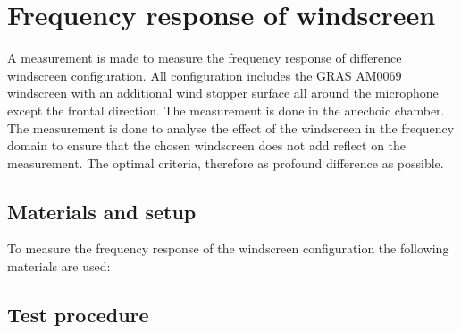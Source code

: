 \chapter{Frequency response of windscreen}\label{ap:wind_screen_freq_res}
A measurement is made to measure the frequency response of difference windscreen configuration. All configuration includes the GRAS AM0069 windscreen with an additional wind stopper surface all around the microphone except the frontal direction. The measurement is done in the anechoic chamber. The measurement is done to analyse the effect of the windscreen in the frequency domain to ensure that the chosen windscreen does not add reflect on the measurement. The optimal criteria, therefore as profound difference as possible. 



\section*{Materials and setup}
To measure the frequency response of the windscreen configuration the following materials are used:

\startequipment
{}
\stopequipment
\startequipment
{}
\stopequipment




\section*{Test procedure}


